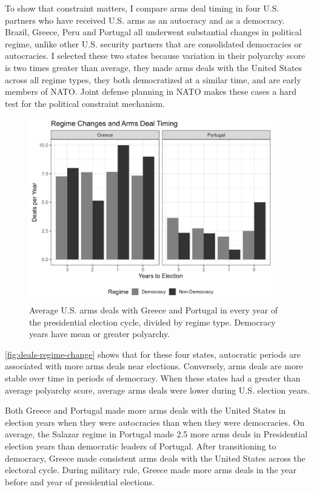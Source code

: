 \documentclass[12pt]{article}
\begin{document}
To show that constraint matters, I compare arms deal timing in four U.S. partners who have received U.S. arms as an autocracy and as a democracy. 
Brazil, Greece, Peru and Portugal all underwent substantial changes in political regime, unlike other U.S. security partners that are consolidated democracies or autocracies. 
I selected these two states because variation in their polyarchy score is two times greater than average, they made arms deals with the United States across all regime types, they both democratized at a similar time, and are early members of NATO. 
Joint defense planning in NATO makes these cases a hard test for the political constraint mechanism.


\begin{figure}[htpb]
	\centering
		\includegraphics[width=0.95\textwidth]{../figures/deals-regime-change.png}
	\caption{Average U.S. arms deals with Greece and Portugal in every year of the presidential election cycle, divided by regime type. Democracy years have mean or greater polyarchy.}
	\label{fig:deals-regime-change}
\end{figure}


\autoref{fig:deals-regime-change} shows that for these four states, autocratic periods are associated with more arms deals near elections.
Conversely, arms deals are more stable over time in periods of democracy. 
When these states had a greater than average polyarchy score, average arms deals were lower during U.S. election years. 


Both Greece and Portugal made more arms deals with the United States in election years when they were autocracies than when they were democracies.
On average, the Salazar regime in Portugal made 2.5 more arms deals in Presidential election years than democratic leaders of Portugal.
After transitioning to democracy, Greece made consistent arms deals with the United States across the electoral cycle.
During military rule, Greece made more arms deals in the year before and year of presidential elections.
\end{document}
